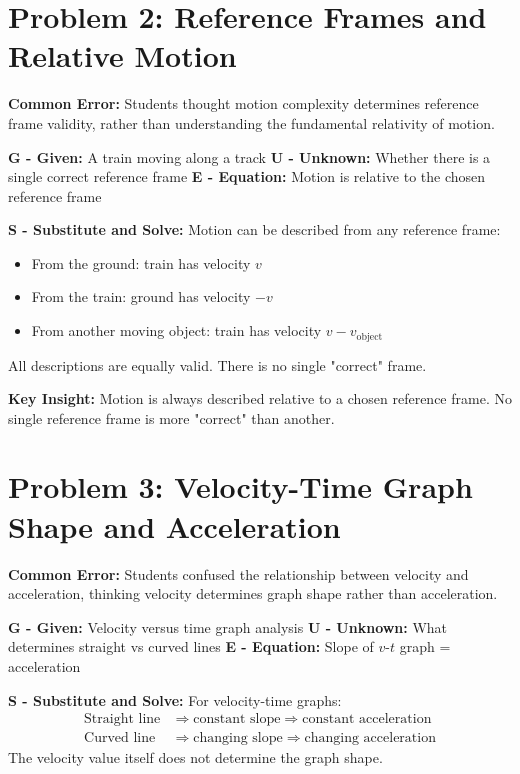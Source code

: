 \documentclass[12pt]{article}
\begin{document}
\section{Problem 2: Reference Frames and Relative Motion}
\textbf{Common Error:} Students thought motion complexity determines reference frame validity, rather than understanding the fundamental relativity of motion.

\textbf{G - Given:} A train moving along a track
\textbf{U - Unknown:} Whether there is a single correct reference frame
\textbf{E - Equation:} Motion is relative to the chosen reference frame

\textbf{S - Substitute and Solve:}
Motion can be described from any reference frame:
\begin{itemize}
\item From the ground: train has velocity $v$
\item From the train: ground has velocity $-v$
\item From another moving object: train has velocity $v - v_{\text{object}}$
\end{itemize}
All descriptions are equally valid. There is no single "correct" frame.

\textbf{Key Insight:} Motion is always described relative to a chosen reference frame. No single reference frame is more "correct" than another.

\section{Problem 3: Velocity-Time Graph Shape and Acceleration}
\textbf{Common Error:} Students confused the relationship between velocity and acceleration, thinking velocity determines graph shape rather than acceleration.

\textbf{G - Given:} Velocity versus time graph analysis
\textbf{U - Unknown:} What determines straight vs curved lines
\textbf{E - Equation:} Slope of $v$-$t$ graph = acceleration

\textbf{S - Substitute and Solve:}
For velocity-time graphs:
\begin{align}
\text{Straight line} &\Rightarrow \text{constant slope} \Rightarrow \text{constant acceleration} \\
\text{Curved line} &\Rightarrow \text{changing slope} \Rightarrow \text{changing acceleration}
\end{align}
The velocity value itself does not determine the graph shape.
\end{document}
